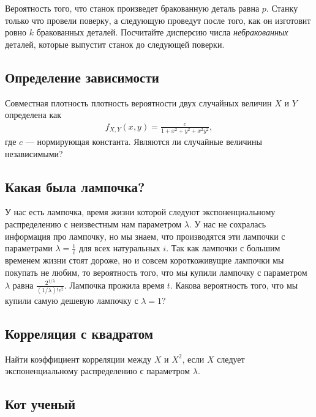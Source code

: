 \documentclass[12pt]{article}
\begin{document}
Вероятность того, что станок произведет бракованную деталь равна $p$. Станку только что провели поверку, а следующую проведут после того, как он изготовит ровно $k$ бракованных деталей. Посчитайте дисперсию числа \emph{небракованных} деталей, которые выпустит станок до следующей поверки.



\subsection{Определение зависимости}

Совместная плотность плотность вероятности двух случайных величин $X$ и $Y$ определена как
\begin{align*}
    f_{X, Y}(x, y) = \frac{c}{1 + x^2 + y^2 + x^2y^2},
\end{align*}
где $c$ --- нормирующая константа. Являются ли случайные величины независимыми?



\subsection{Какая была лампочка?}

У нас есть лампочка, время жизни которой следуют экспоненциальному распределению с неизвестным нам параметром $\lambda$. У нас не сохралась информация про лампочку, но мы знаем, что производятся эти лампочки с параметрами $\lambda = \frac{1}{i}$ для всех натуральных $i$. Так как лампочки с большим временем жизни стоят дороже, но и совсем короткоживущие лампочки мы покупать не любим, то вероятность того, что мы купили лампочку с параметром $\lambda$ равна $\frac{2^{1/\lambda}}{(1/\lambda)!e^2}$. Лампочка прожила время $t$. Какова вероятность того, что мы купили самую дешевую лампочку с $\lambda = 1$?




\subsection{Корреляция с квадратом}

Найти коэффициент корреляции между $X$ и $X^2$, если $X$ следует экспоненциальному распределению с параметром $\lambda$.



\subsection{Кот ученый}
\end{document}
